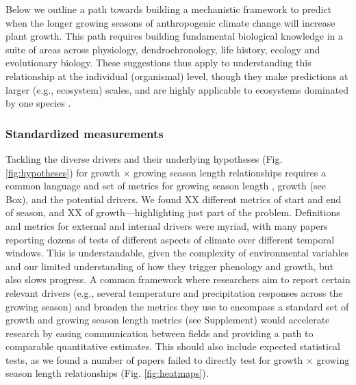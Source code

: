 \documentclass[11pt]{article}
\begin{document}

Below we outline a path towards building a mechanistic framework to predict when the longer growing seasons of anthropogenic climate change will increase plant growth. This path requires building fundamental biological knowledge in a suite of areas across physiology, dendrochronology, life history, ecology and evolutionary biology. These suggestions thus apply to understanding this relationship at the individual (organismal) level, though they make predictions at larger (e.g., ecosystem) scales, and are highly applicable to ecosystems dominated by one species \citep[e.g.,][]{chen1999effects}. %

\subsubsection*{Standardized measurements} %

Tackling the diverse drivers and their underlying hypotheses (Fig. \ref{fig:hypotheses}) for growth $\times$ growing season length relationships requires a common language and set of metrics for growing season length \citep{korner2023four}, growth (see Box), and the potential drivers. We found XX different metrics of start and end of season, and XX of growth---highlighting just part of the problem. Definitions and metrics for external and internal drivers were myriad, with many papers reporting dozens of tests of different aspects of climate over different temporal windows. This is understandable, given the complexity of environmental variables and our limited understanding of how they trigger phenology and growth, but also slows progress. A common framework where researchers aim to report certain relevant drivers (e.g., several temperature and precipitation responses across the growing season) and broaden the metrics they use to encompass a standard set of growth and growing season length metrics (see Supplement) would accelerate research by easing communication between fields and providing a path to comparable quantitative estimates. This should also include expected statistical tests, as we found a number of papers failed to directly test for growth $\times$ growing season length relationships (Fig. \ref{fig:heatmaps}). %
\end{document}
